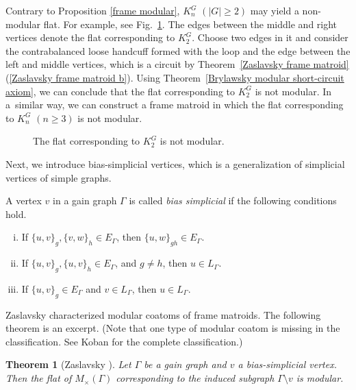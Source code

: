 \documentclass[pdftex]{sigma}
\numberwithin{equation}{section}
\newtheorem{Theorem}{Theorem}[section]
\begin{document}
\begin{Remark}
Contrary to Proposition \ref{frame modular}, $ K_{n}^{G}$ $(|G| \geq 2) $ may yield a non-modular flat.
For example, see Fig.~\ref{Fig:fish}.
The edges between the middle and right vertices denote the flat corresponding to $ K_{2}^{G} $.
Choose two edges in it and consider the contrabalanced loose handcuff formed with the loop and the edge between the left and middle vertices, which is a circuit by Theorem~\ref{Zaslavsky frame matroid}(\ref{Zaslavsky frame matroid b}).
Using Theorem~\ref{Brylawsky modular short-circuit axiom}, we can conclude that the flat corresponding to $ K_{2}^{G} $ is not modular.
In a~similar way, we can construct a frame matroid in which the flat corresponding to $ K_{n}^{G}$ $(n \geq 3) $ is not modular.
\end{Remark}
\begin{figure}[t]\centering

\caption{The flat corresponding to $ K_{2}^{G} $ is not modular.}\label{Fig:fish}
\end{figure}

Next, we introduce bias-simplicial vertices, which is a generalization of simplicial vertices of simple graphs.
\begin{Definition}
A vertex $ v $ in a gain graph $ \Gamma $ is called \textit{bias simplicial} if the following conditions hold.
\begin{enumerate}[(i)]\itemsep=0pt
\item If $ \{u,v\}_{g}, \{v,w\}_{h} \in E_{\Gamma} $, then $ \{u,w\}_{gh} \in E_{\Gamma} $.
\item If $ \{u,v\}_{g}, \{u,v\}_{h} \in E_{\Gamma} $, and $ g \neq h $, then $ u \in L_{\Gamma} $.
\item If $ \{u,v\}_{g} \in E_{\Gamma} $ and $ v \in L_{\Gamma} $, then $ u \in L_{\Gamma} $.
\end{enumerate}
\end{Definition}

Zaslavsky \cite[Theorem 2.1]{zaslavsky2001supersolvable-ejoc} characterized modular coatoms of frame matroids.
The following theorem is an excerpt.
(Note that one type of modular coatom is missing in the classification. See Koban \cite[Theorem $ 2.1^{\prime} $]{koban2004comments-ejoc} for the complete classification.)
\begin{Theorem}[{Zaslavsky \cite[Theorem 2.1(1)]{zaslavsky2001supersolvable-ejoc}}]\label{Zaslavsky bias simplicial}
Let $ \Gamma $ be a gain graph and $ v $ a bias-simplicial vertex.
Then the flat of $ M_{\times}(\Gamma) $ corresponding to the induced subgraph $ \Gamma \setminus v $ is modular.
\end{Theorem}
\end{document}
